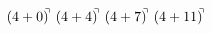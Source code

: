 \documentclass[preview]{standalone}
\begin{document}
\begin{align*}
(4+0)^{\hspace{-0.1cm}\urcorner} \ (4+4)^{\hspace{-0.1cm}\urcorner} \ (4+7)^{\hspace{-0.1cm}\urcorner} \ (4+11)^{\hspace{-0.1cm}\urcorner}
\end{align*}
\end{document}

